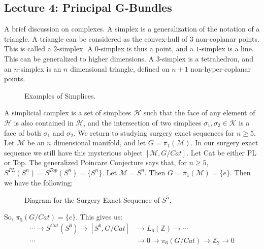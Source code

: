     \subsection{Lecture 4: Principal G-Bundles}
        A brief discussion on complexes. A simplex
        is a generalization of the notation of a triangle.
        A triangle can be considered as the
        convex-hull of $3$ non-coplanar points.
        This is called a $2$-simplex. A $0$-simplex
        is thus a point, and a $1$-simplex is a line.
        This can be generalized to higher dimensions.
        A $3$-simplex is a tetrahedron,
        and an $n$-simplex is an $n$ dimensional triangle,
        defined on $n+1$ non-hyper-coplanar points.
        \begin{figure}[H]
            \centering
            \captionsetup{type=figure}
            
            \caption{Examples of Simplices.}
            \label{fig:surgery_theory_simplexes}
        \end{figure}
        A simplicial complex is a set of simplices
        $\mathcal{H}$ such that the face of any element
        of $\mathcal{H}$ is also contained in $\mathcal{H}$,
        and the intersection of two simplices
        $\sigma_{1},\sigma_{2}\in \mathcal{K}$ is a
        face of both $\sigma_{1}$ and $\sigma_{2}$.
        We return to studying surgery exact sequences
        for $n\geq 5$. Let $\mathcal{M}$ be an $n$
        dimensional manifold, and let $G=\pi_{1}(\mathcal{M})$.
        In our surgery exact sequence we still have this
        mysterious object $[\mathcal{M},G/Cat]$. Let Cat
        be either PL or Top. The generalized Poincare
        Conjecture says that, for $n\geq 5$,
        $S^{PL}(S^{n})=S^{Top}(S^{n})=\{S^{n}\}$.
        Let $\mathcal{M}=S^{n}$. Then
        $G=\pi_{1}(\mathcal{M})=\{e\}$.
        Then we have the following:
        \begin{figure}[H]
            \centering
            \captionsetup{type=figure}
            
            \caption{Diagram for the Surgery Exact Sequence of $S^{5}$.}
            \label{fig:surgery_theory_example_diagram_%
                   for_surgery_exact_sequence}
        \end{figure}
        So, $\pi_{5}(G/Cat)=\{e\}$. This gives us:
        \begin{align*}
            \cdots\rightarrow
            S^{Cat}(S^{6})\rightarrow
            [S^{6},G/Cat]
            &\rightarrow
            L_{6}(\mathbb{Z})\rightarrow\cdots\\
            \cdots
            &\rightarrow{0}\rightarrow\pi_{6}(G/Cat)\rightarrow
            \mathbb{Z}_{2}\rightarrow{0}
        \end{align*}
